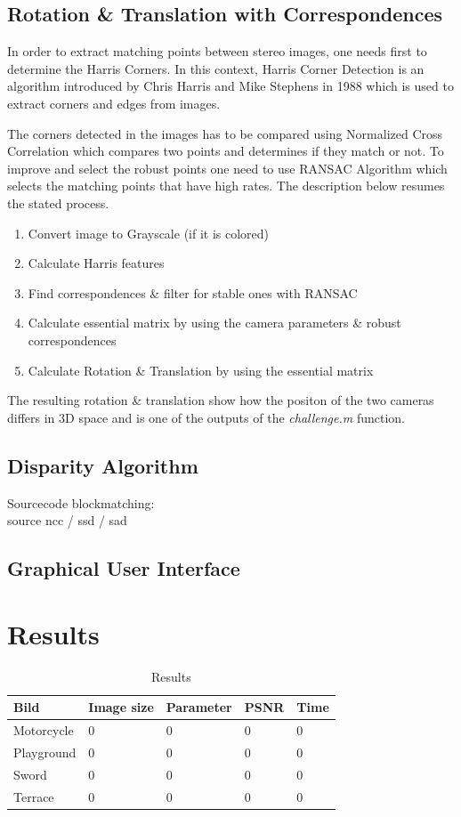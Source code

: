 \documentclass[doctype=Studienarbeit,BCOR=15mm]{ldvbook}
\begin{document}
\section{Rotation \& Translation with Correspondences}
In order to extract matching points between stereo images, one needs first to determine the Harris Corners. In this context, Harris Corner Detection is an algorithm introduced by Chris Harris and Mike Stephens \cite{harris1988combined} in 1988 which is used to extract corners and edges from images.

The corners detected in the images has to be compared using Normalized Cross Correlation which compares two points and determines if they match or not. To improve and select the robust points one need to use RANSAC Algorithm \cite{cantzler1981random} which selects the matching points that have high rates. The description below resumes the stated process.

\begin{enumerate}
\item Convert image to Grayscale (if it is colored)
\item Calculate Harris features
\item Find correspondences \& filter for stable ones with RANSAC
\item Calculate essential matrix by using the camera parameters \& robust correspondences
\item Calculate Rotation \& Translation by using the essential matrix
\end{enumerate}

The resulting rotation \& translation show how the positon of the two cameras differs in 3D space and is one of the outputs of the \textit{challenge.m} function.

\section{Disparity Algorithm}
Sourcecode blockmatching: \cite{Chris} \\
source ncc / ssd / sad \cite{fouda2015normalize}
\section{Graphical User Interface}

\chapter{Results}

\begin{table}
\centering
\begin{tabular}{lllll}
	\hline
	\textbf{Bild} & \textbf{Image size} & \textbf{Parameter} & \textbf{PSNR} & \textbf{Time} \\
	\hline
	Motorcycle & 0 & 0 & 0 & 0 \\
	Playground & 0 & 0 & 0 & 0 \\
	Sword & 0 & 0 & 0 & 0 \\
	Terrace & 0 & 0 & 0 & 0 \\
	\hline
\end{tabular}
\caption{Results}
\label{tab:threecols}
\end{table}
\end{document}
